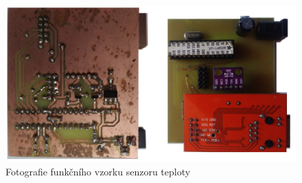 \documentclass[12pt,a4paper]{article}
\begin{document}
\begin{figure}[H]
\centering
\label{fig:foto/arduino-ethernet-sensor}
\includegraphics[width = 150mm]{img/foto/arduino-ethernet-sensor.jpg}
\caption{Fotografie funkčního vzorku senzoru teploty}
\end{figure}

\newpage

\printindex[zkr]


\newpage
\end{document}
